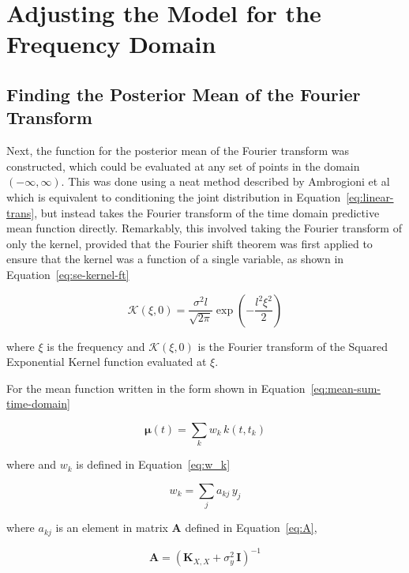 \documentclass[12pt]{article}
\begin{document}
    \section{Adjusting the Model for the Frequency Domain}

    \subsection{Finding the Posterior Mean of the Fourier Transform}
    Next, the function for the posterior mean of the Fourier transform was constructed, which could be evaluated at any set of points in the domain $(-\infty, \infty)$.
    This was done using a neat method described by Ambrogioni et al~\cite{Ambrogioni2018} which is equivalent to conditioning the joint distribution in Equation~\ref{eq:linear-trans}, but instead takes the Fourier transform of the time domain predictive mean function directly.
    Remarkably, this involved taking the Fourier transform of only the kernel, provided that the Fourier shift theorem was first applied to ensure that the kernel was a function of a single variable, as shown in Equation~\ref{eq:se-kernel-ft}

    \begin{equation}
        \mathcal{K}(\xi,0) = \frac{\sigma^2 l}{\sqrt{2 \pi}} \exp\left(-\frac{l^2 \xi^2}{2}\right) \label{eq:se-kernel-ft}
    \end{equation}

    \noindent where $\xi$ is the frequency and $\mathcal{K}(\xi,0)$ is the Fourier transform of the Squared Exponential Kernel function evaluated at $\xi$.

    For the mean function written in the form shown in Equation~\ref{eq:mean-sum-time-domain}

    \begin{equation}
        \mathbf{\mu}(t) = \sum_{k} w_k \, k(t,t_k) \label{eq:mean-sum-time-domain}
    \end{equation}

    \noindent where and $w_k$ is defined in Equation~\ref{eq:w_k}

    \begin{equation}
        w_k = \sum_{j} a_{kj} \, y_j \label{eq:w_k}
    \end{equation}

    \noindent where $a_{kj}$ is an element in matrix $\mathbf{A}$ defined in Equation~\ref{eq:A},

    \begin{equation}
         \mathbf{A} = (\mathbf{K}_{X,X} + \sigma^2_y \, \mathbf{I})^{-1} \label{eq:A}
    \end{equation}
\end{document}
